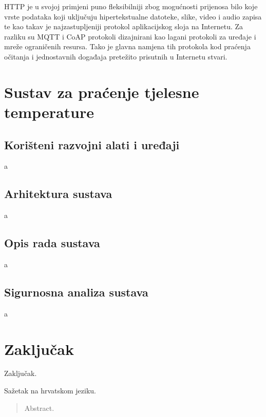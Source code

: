 \documentclass[times, utf8, diplomski]{fer}
\begin{document}
HTTP je u svojoj primjeni puno fleksibilniji zbog mogućnosti prijenosa bilo koje vrste podataka koji uključuju hipertekstualne datoteke, slike, video i audio zapisa te kao takav je najzastupljeniji protokol aplikacijskog sloja na Internetu. Za razliku su MQTT i CoAP protokoli dizajnirani kao lagani protokoli za uređaje i mreže ograničenih resursa. Tako je glavna namjena tih protokola kod praćenja očitanja i jednostavnih događaja pretežito prisutnih u Internetu stvari.

\chapter{Sustav za praćenje tjelesne temperature}
\section{Korišteni razvojni alati i uređaji}
a

\section{Arhitektura sustava}
a

\section{Opis rada sustava}
a

\section{Sigurnosna analiza sustava}
a


\chapter{Zaključak}
Zaključak.



\listoffigures
\listoftables

\begin{sazetak}
Sažetak na hrvatskom jeziku.

\end{sazetak}

\begin{abstract}
Abstract.

\end{abstract}
\end{document}
